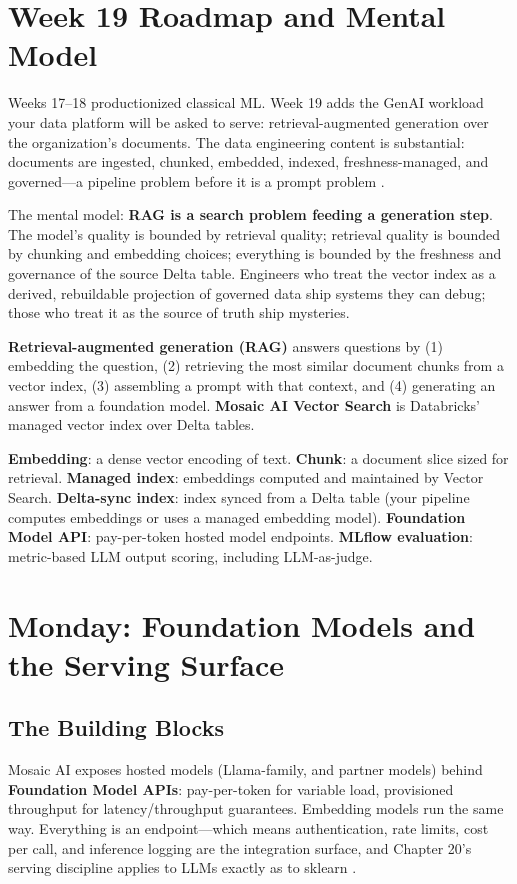\section{Week 19 Roadmap and Mental Model}
Weeks 17--18 productionized classical ML. Week 19 adds the GenAI workload your data platform will be asked to serve: retrieval-augmented generation over the organization's documents. The data engineering content is substantial: documents are ingested, chunked, embedded, indexed, freshness-managed, and governed---a pipeline problem before it is a prompt problem \cite{databricksMosaicAI,databricksVectorSearch}.

The mental model: \textbf{RAG is a search problem feeding a generation step}. The model's quality is bounded by retrieval quality; retrieval quality is bounded by chunking and embedding choices; everything is bounded by the freshness and governance of the source Delta table. Engineers who treat the vector index as a derived, rebuildable projection of governed data ship systems they can debug; those who treat it as the source of truth ship mysteries.

\begin{definitionbox}
\textbf{Retrieval-augmented generation (RAG)} answers questions by (1) embedding the question, (2) retrieving the most similar document chunks from a vector index, (3) assembling a prompt with that context, and (4) generating an answer from a foundation model. \textbf{Mosaic AI Vector Search} is Databricks' managed vector index over Delta tables.
\end{definitionbox}

\begin{keyterms}
\textbf{Embedding}: a dense vector encoding of text. \textbf{Chunk}: a document slice sized for retrieval. \textbf{Managed index}: embeddings computed and maintained by Vector Search. \textbf{Delta-sync index}: index synced from a Delta table (your pipeline computes embeddings or uses a managed embedding model). \textbf{Foundation Model API}: pay-per-token hosted model endpoints. \textbf{MLflow evaluation}: metric-based LLM output scoring, including LLM-as-judge.
\end{keyterms}

\section{Monday: Foundation Models and the Serving Surface}
\subsection{The Building Blocks}
Mosaic AI exposes hosted models (Llama-family, and partner models) behind \textbf{Foundation Model APIs}: pay-per-token for variable load, provisioned throughput for latency/throughput guarantees. Embedding models run the same way. Everything is an endpoint---which means authentication, rate limits, cost per call, and inference logging are the integration surface, and Chapter 20's serving discipline applies to LLMs exactly as to sklearn \cite{databricksModelServing}.

